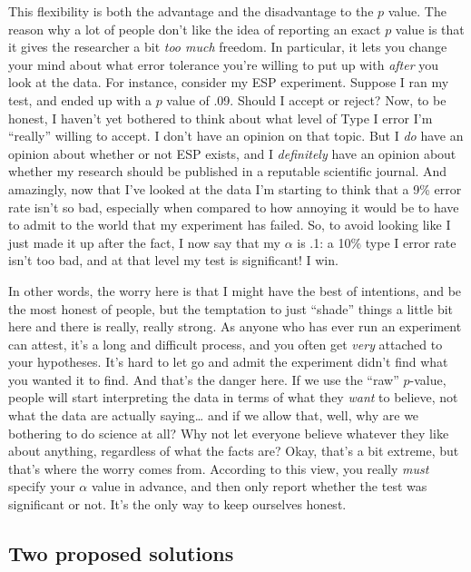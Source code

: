 \documentclass[
]{book}
\begin{document}
This flexibility is both the advantage and the disadvantage to the \(p\) value. The reason why a lot of people don't like the idea of reporting an exact \(p\) value is that it gives the researcher a bit \emph{too much} freedom. In particular, it lets you change your mind about what error tolerance you're willing to put up with \emph{after} you look at the data. For instance, consider my ESP experiment. Suppose I ran my test, and ended up with a \(p\) value of .09. Should I accept or reject? Now, to be honest, I haven't yet bothered to think about what level of Type I error I'm ``really'' willing to accept. I don't have an opinion on that topic. But I \emph{do} have an opinion about whether or not ESP exists, and I \emph{definitely} have an opinion about whether my research should be published in a reputable scientific journal. And amazingly, now that I've looked at the data I'm starting to think that a 9\% error rate isn't so bad, especially when compared to how annoying it would be to have to admit to the world that my experiment has failed. So, to avoid looking like I just made it up after the fact, I now say that my \(\alpha\) is .1: a 10\% type I error rate isn't too bad, and at that level my test is significant! I win.

In other words, the worry here is that I might have the best of intentions, and be the most honest of people, but the temptation to just ``shade'' things a little bit here and there is really, really strong. As anyone who has ever run an experiment can attest, it's a long and difficult process, and you often get \emph{very} attached to your hypotheses. It's hard to let go and admit the experiment didn't find what you wanted it to find. And that's the danger here. If we use the ``raw'' \(p\)-value, people will start interpreting the data in terms of what they \emph{want} to believe, not what the data are actually saying\ldots{} and if we allow that, well, why are we bothering to do science at all? Why not let everyone believe whatever they like about anything, regardless of what the facts are? Okay, that's a bit extreme, but that's where the worry comes from. According to this view, you really \emph{must} specify your \(\alpha\) value in advance, and then only report whether the test was significant or not. It's the only way to keep ourselves honest.

\hypertarget{two-proposed-solutions}{%
\subsection{Two proposed solutions}\label{two-proposed-solutions}}
\end{document}

